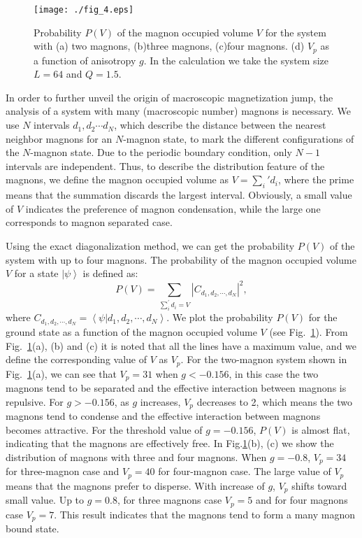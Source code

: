 \documentclass[article,10pt,onecolumn,superscriptaddress,floatfix]{revtex4}
\begin{document}
\begin{figure}[!tb] %
	\centering
	\texttt{[image: ./fig\_4.eps]}
	\caption{Probability $P(V)$ of the magnon occupied volume $V$ for the system with (a) two magnons, (b)three magnons, (c)four magnons. (d) $V_{p}$ as a function of anisotropy $g$. In the calculation we take the system size $L=64$ and $Q=1.5$.}
	\label{fig:multi_magnons}
\end{figure}

In order to further unveil the origin of macroscopic magnetization jump,  the analysis of a system with many (macroscopic number) magnons is necessary. We use $N$ intervals $d_{1},d_{2}\cdots d_{N}$, which describe the distance between the nearest neighbor magnons for an $N$-magnon state, to mark the different configurations of the $N$-magnon state. Due to the periodic boundary condition, only $N-1$ intervals are independent. Thus, to describe the distribution feature of the magnons, we define the magnon occupied volume as $V=\sum_{i}'d_{i}$\cite{Kecke2007}, where the prime means that the summation discards the largest interval. Obviously, a small value of $V$ indicates the preference of magnon condensation, while the large one corresponds to magnon separated case.

Using the exact diagonalization method, we can get the probability $P(V)$ of the system with up to four magnons.
The probability of the magnon occupied volume $V$ for a state $\left|\psi\right\rangle$ is defined as:
\begin{equation}
P(V)=\sum_{\sum_{i}^{\prime}d_{i}=V}\left|C_{d_{1},d_{2},\cdots,d_{N}}\right|^{2},
\end{equation}
where $C_{d_{1},d_{2},\cdots,d_{N}}=\left\langle \psi\big|d_{1},d_{2},\cdots,d_{N}\right\rangle$.
We plot the probability $P(V)$ for the ground state as a function of the magnon occupied volume $V$ (see Fig.~\ref{fig:multi_magnons}). From Fig.~\ref{fig:multi_magnons}(a), (b) and (c) it is noted that all the lines have a maximum value, and we define the corresponding value of $V$ as $V_p$. For the two-magnon system shown in Fig.~\ref{fig:multi_magnons}(a), we can see that $V_p=31$ when $g<-0.156$, in this case the two magnons tend to be separated and the effective interaction between magnons is repulsive. For $g>-0.156$, as $g$ increases, $V_p$ decreases to 2, which means the two magnons tend to condense and the effective interaction between magnons becomes attractive.
For the threshold value of $g=-0.156$, $P(V)$ is almost flat, indicating that the magnons are effectively free.
In Fig.\ref{fig:multi_magnons}(b), (c) we show the distribution of magnons with three and four magnons.  When $g=-0.8$, $V_{p}=34$ for three-magnon case and $V_{p}=40$ for four-magnon case. The large value of $V_{p}$ means that the magnons prefer to disperse.
With increase of $g$, $V_{p}$ shifts toward small value. Up to $g=0.8$, for three magnons case $V_{p}=5$ and for four magnons case $V_{p}=7$. This result indicates that the magnons tend to form a many magnon bound state.
\end{document}
